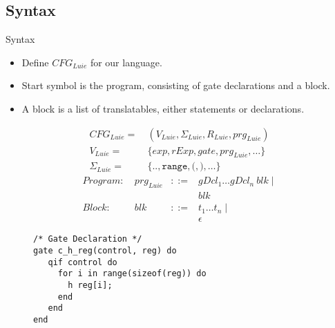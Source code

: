\subsection{Syntax}
\begin{frame}[fragile]{Syntax}
    \begin{itemize}
        \item Define $CFG_{Luie}$ for our language.
        \item Start symbol is the program, consisting of gate declarations and a block.
        \item A block is a list of translatables, either statements or declarations.
    \end{itemize}
    \vfill
    \begin{minipage}{.45\textwidth}
        \Large
        \begin{align*}
            CFG_{Luie} = \ & (V_{Luie}, \Sigma_{Luie}, R_{Luie}, prg_{Luie} )\\ 
            V_{Luie} = \ & \{ exp, rExp, gate, prg_{Luie}, \dots \}\\ 
            \Sigma_{Luie} = \ & \{\texttt{..}, \texttt{range}, \texttt{(}, \texttt{)}, \dots \} 
        \end{align*}
        \vspace{\alignmargin}
        \begin{align*}
            Program: \ & prg_{Luie} &::=& gDcl_1 \dots gDcl_n \ blk \mid \\
                       &            &   & blk \\
            Block: \ & blk &::=&  t_1 \dots t_n \mid \\
                       &       &&  \epsilon
        \end{align*}
    \end{minipage}
    \begin{minipage}{.50\textwidth}
        \begin{figure}[htp]
            \centering     
            \begin{lstlisting}[style=Luie, basicstyle=\ttfamily\large]
/* Gate Declaration */
gate c_h_reg(control, reg) do
   qif control do
     for i in range(sizeof(reg)) do
       h reg[i];
     end
   end
end


\end{lstlisting}
\end{figure}
\end{minipage}
\end{frame}
